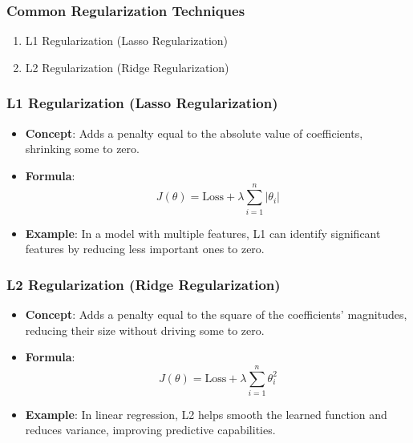 \documentclass[aspectratio=169]{beamer}
\begin{document}
\begin{frame}[fragile]
    \frametitle{Common Regularization Techniques}
    \begin{enumerate}
        \item L1 Regularization (Lasso Regularization)
        \item L2 Regularization (Ridge Regularization)
    \end{enumerate}
\end{frame}

\begin{frame}[fragile]
    \frametitle{L1 Regularization (Lasso Regularization)}
    \begin{itemize}
        \item \textbf{Concept}: Adds a penalty equal to the absolute value of coefficients, shrinking some to zero.
        \item \textbf{Formula}:
        \begin{equation}
            J(\theta) = \text{Loss} + \lambda \sum_{i=1}^{n} |\theta_i|
        \end{equation}
        \item \textbf{Example}: In a model with multiple features, L1 can identify significant features by reducing less important ones to zero.
    \end{itemize}
\end{frame}

\begin{frame}[fragile]
    \frametitle{L2 Regularization (Ridge Regularization)}
    \begin{itemize}
        \item \textbf{Concept}: Adds a penalty equal to the square of the coefficients' magnitudes, reducing their size without driving some to zero.
        \item \textbf{Formula}:
        \begin{equation}
            J(\theta) = \text{Loss} + \lambda \sum_{i=1}^{n} \theta_i^2
        \end{equation}
        \item \textbf{Example}: In linear regression, L2 helps smooth the learned function and reduces variance, improving predictive capabilities.
    \end{itemize}
\end{frame}
\end{document}
